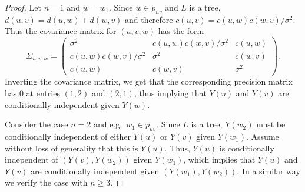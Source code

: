 \documentclass[alpha-refs]{wiley-article}
\begin{document}
\begin{proof}
	Let $n=1$ and $w=w_1$.
	Since $w\in p_{uv}$ and $L$ is a tree, $d(u,v) = d(u,w) + d(w,v)$ and therefore $c(u,v) = c(u,w)c(w,v)/\sigma^2$. Thus the covariance matrix for $(u,v,w)$ has the form 
	\begin{equation*}
	\Sigma_{u,v,w} = 
	\begin{pmatrix}
	\sigma^2 & c(u,w)c(w,v)/\sigma^2 & c(u,w) \\
	c(u,w)c(w,v)/\sigma^2 & \sigma^2 & c(w,v) \\
	c(u,w) & c(w,v) & \sigma^2
	\end{pmatrix}.
	\end{equation*}
	Inverting the covariance matrix, we get that the corresponding precision matrix has 0 at entries $(1,2)$ and $(2,1)$, thus implying that $Y(u)$ and $Y(v)$ are conditionally independent given $Y(w)$. 
	
	 Consider the case $n=2$ and e.g.\ $w_1\in p_{uv}$. Since $L$ is a tree, $Y(w_2)$ must be conditionally independent of either $Y(u)$ or $Y(v)$ given $Y(w_1)$. Assume without loss of generality that this is $Y(u)$. Thus, $Y(u)$ is conditionally independent of $(Y(v),Y(w_2))$ given $Y(w_1)$, which implies that $Y(u)$ and $Y(v)$ are conditionally independent given $(Y(w_1),Y(w_2))$. In a similar way we  verify the case with $n\ge3$. 
\end{proof}
\end{document}

